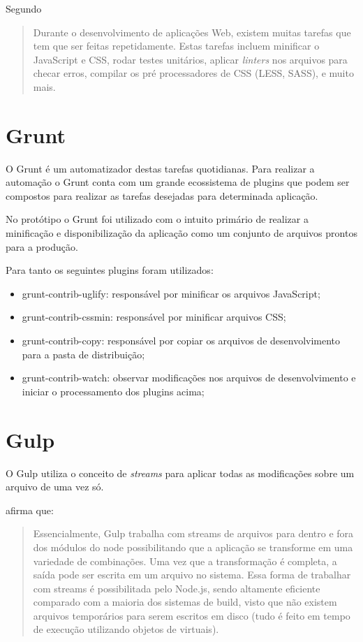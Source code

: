 Segundo \citet{gruntTutorial}
\begin{quote}
Durante o desenvolvimento de aplicações Web, existem muitas tarefas
que tem que ser feitas repetidamente. Estas tarefas incluem minificar o
JavaScript e CSS, rodar testes unitários, aplicar \textit{linters} nos
arquivos para checar erros, compilar os pré processadores de CSS (LESS,
SASS), e muito mais.
\end{quote}

\section{Grunt}

O Grunt é um automatizador destas tarefas quotidianas. Para realizar
a automação o Grunt conta com um grande ecossistema de plugins que
podem ser compostos para realizar as tarefas desejadas para determinada
aplicação.

No protótipo o Grunt foi utilizado com o intuito primário de realizar
a minificação e disponibilização da aplicação como um conjunto de
arquivos prontos para a produção.

Para tanto os seguintes plugins foram utilizados:
\begin{itemize}
    \item grunt-contrib-uglify: responsável por minificar os arquivos JavaScript;
    \item grunt-contrib-cssmin: responsável por minificar arquivos CSS;
    \item grunt-contrib-copy: responsável por copiar os arquivos de desenvolvimento para a pasta de distribuição;
    \item grunt-contrib-watch: observar modificações nos arquivos de desenvolvimento e iniciar o processamento dos plugins acima;
\end{itemize}

\section{Gulp}

O Gulp utiliza o conceito de \textit{streams} para aplicar todas as
modificações sobre um arquivo de uma vez só.

\citet{crossPlatformMobileGame} afirma que:
\begin{quote}
Essencialmente, Gulp trabalha com streams de arquivos para dentro e fora
dos módulos do node possibilitando que a aplicação se transforme
em uma variedade de combinações. Uma vez que a transformação é
completa, a saída pode ser escrita em um arquivo no sistema. Essa forma
de trabalhar com streams é possibilitada pelo Node.js, sendo altamente
eficiente comparado com a maioria dos sistemas de build, visto que não
existem arquivos temporários para serem escritos em disco (tudo é
feito em tempo de execução utilizando objetos de virtuais).
\end{quote}

